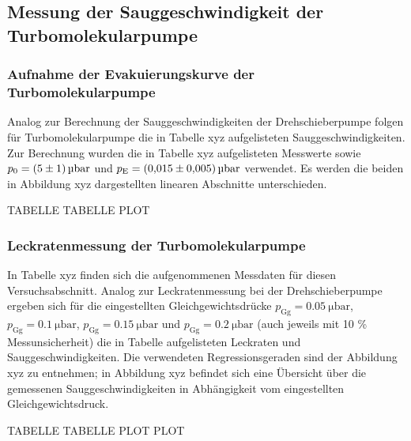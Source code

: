 			
	\subsection{Messung der Sauggeschwindigkeit der Turbomolekularpumpe}
	
		\subsubsection{Aufnahme der Evakuierungskurve der Turbomolekularpumpe}
			
			Analog zur Berechnung der Sauggeschwindigkeiten der Drehschieberpumpe folgen für Turbomolekularpumpe die in Tabelle xyz aufgelisteten Sauggeschwindigkeiten. Zur Berechnung wurden die in Tabelle xyz aufgelisteten Messwerte sowie $p_0 = \SI{5 +- 1}{\micro \bar}$ und $p_\text{E} = \SI{0.015 +- 0.005}{\micro \bar}$ verwendet. Es werden die beiden in Abbildung xyz dargestellten linearen Abschnitte unterschieden. 
			
			TABELLE
			TABELLE
			PLOT
			
		\subsubsection{Leckratenmessung der Turbomolekularpumpe}
			
			In Tabelle xyz finden sich die aufgenommenen Messdaten für diesen Versuchsabschnitt. Analog zur Leckratenmessung bei der Drehschieberpumpe ergeben sich für die eingestellten Gleichgewichtsdrücke $p_\text{Gg} = \SI{0.05}{\micro \bar}$, $p_\text{Gg} = \SI{0.1}{\micro \bar}$, $p_\text{Gg} = \SI{0.15}{\micro \bar}$ und $p_\text{Gg} = \SI{0.2}{\micro \bar}$ (auch jeweils mit 10 \% Messunsicherheit) die in Tabelle aufgelisteten Leckraten und Sauggeschwindigkeiten. Die verwendeten Regressionsgeraden sind der Abbildung xyz zu entnehmen; in Abbildung xyz befindet sich eine Übersicht über die gemessenen Sauggeschwindigkeiten in Abhängigkeit vom eingestellten Gleichgewichtsdruck.
			
			TABELLE
			TABELLE
			PLOT
			PLOT  